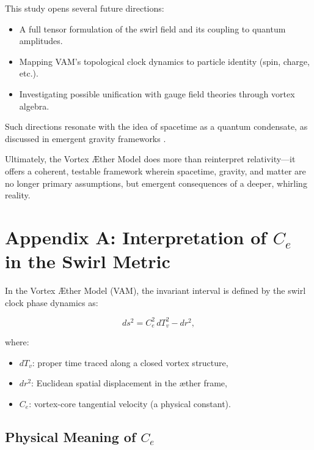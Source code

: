 \documentclass[12pt]{article}
\begin{document}
    This study opens several future directions:

    \begin{itemize}
        \item A full tensor formulation of the swirl field and its coupling to quantum amplitudes.
        \item Mapping VAM’s topological clock dynamics to particle identity (spin, charge, etc.).
        \item Investigating possible unification with gauge field theories through vortex algebra.
    \end{itemize}

Such directions resonate with the idea of spacetime as a quantum condensate, as discussed in emergent gravity frameworks \cite{hu2005condensate}.

    Ultimately, the Vortex Æther Model does more than reinterpret relativity—it offers a coherent, testable framework wherein spacetime, gravity, and matter are no longer primary assumptions, but emergent consequences of a deeper, whirling reality.




\appendix
    \section*{Appendix A: Interpretation of \( C_e \) in the Swirl Metric}\label{sec:interpretation_c_e}

    In the Vortex \AE{}ther Model (VAM), the invariant interval is defined by the swirl clock phase dynamics as:

    \[
        ds^2 = C_e^2\, dT_v^2 - dr^2,
    \]

    where:
    \begin{itemize}
        \item \( dT_v \): proper time traced along a closed vortex structure,
        \item \( dr^2 \): Euclidean spatial displacement in the æther frame,
        \item \( C_e \): vortex-core tangential velocity (a physical constant).
    \end{itemize}

    \subsection*{Physical Meaning of \( C_e \)}
\end{document}
